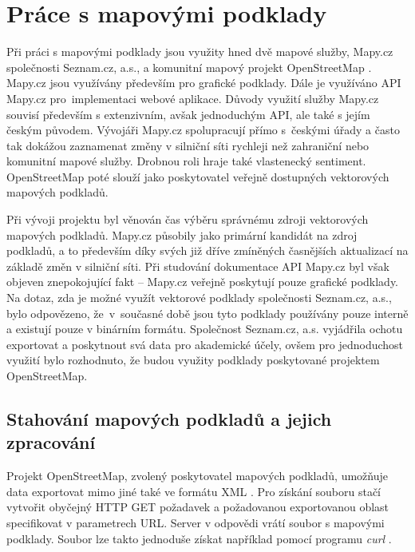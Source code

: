 \documentclass[czech, bachelor]{diploma}
\begin{document}
\chapter{Práce s mapovými podklady} \label{osm-chapter}

Při práci s mapovými podklady jsou využity hned dvě mapové služby, Mapy.cz \cite{mapycz-source} společnosti Seznam.cz, a.s., a
komunitní mapový projekt OpenStreetMap \cite{openstreetmap-source}. Mapy.cz jsou využívány především pro grafické podklady. Dále
je využíváno API Mapy.cz \cite{apimapycz-source} pro~implementaci webové aplikace. Důvody využití služby Mapy.cz souvisí především
s extenzivním, avšak jednoduchým API, ale také s jejím českým původem. Vývojáři Mapy.cz spolupracují přímo s~českými úřady a často
tak dokážou zaznamenat změny v silniční síti rychleji než zahraniční nebo komunitní mapové služby. Drobnou roli hraje také
vlastenecký sentiment. OpenStreetMap poté slouží jako poskytovatel veřejně dostupných vektorových mapových podkladů.

Při vývoji projektu byl věnován čas výběru správnému zdroji vektorových mapových podkladů. Mapy.cz působily jako primární kandidát
na zdroj podkladů, a to především díky svých již dříve zmíněných časnějších aktualizací na základě změn v silniční síti.
Při studování dokumentace API Mapy.cz byl však objeven znepokojující fakt -- Mapy.cz veřejně poskytují pouze grafické podklady.
Na dotaz, zda je možné využít vektorové podklady společnosti Seznam.cz, a.s., bylo odpovězeno, že~v~současné době jsou tyto
podklady používány pouze interně a existují pouze v binárním formátu. Společnost Seznam.cz, a.s. vyjádřila ochotu exportovat
a poskytnout svá data pro akademické účely, ovšem pro jednoduchost využití bylo rozhodnuto, že budou využity podklady poskytované
projektem OpenStreetMap.

\section{Stahování mapových podkladů a jejich zpracování}

Projekt OpenStreetMap, zvolený poskytovatel mapových podkladů, umožňuje data exportovat mimo jiné také ve formátu XML \cite{
openstreetmap-export-source, xml-source}. Pro získání souboru stačí vytvořit obyčejný HTTP GET \cite{http-source} požadavek a
požadovanou exportovanou oblast specifikovat v parametrech URL. Server v odpovědi vrátí soubor s mapovými podklady. Soubor lze
takto jednoduše získat například pomocí programu \emph{curl} \cite{curl-source}.
\end{document}

